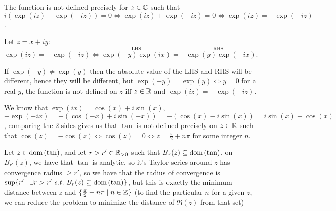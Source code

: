 \begin{cExercise}
	\begin{cPart}
		The function is not defined precisely for $z\in\mathbb C$ such that $i(\exp(iz)+\exp(-iz))= 0\iff \exp(iz)+\exp(-iz)= 0\iff \exp(iz)= -\exp(-iz)$.
		
		Let $z=x+i y$: $\exp(iz)= -\exp(-iz)\iff \overset{\text{LHS}}{\exp(-y)\exp(ix)}=\overset{\text{RHS}}{-\exp(y)\exp(-ix)}$.
		
		If $\exp(-y)\ne \exp(y)$ then the absolute value of the LHS and RHS will be different, hence they will be different, but $\exp(-y)=\exp(y)\iff y=0$ for a real $y$, the function is not defined on $z$ iff $z\in \mathbb R$ and $\exp(iz)=-\exp(-iz)$.
		
		We know that $\exp(ix)=\cos(x)+i\sin(x)$, $-\exp(-ix)=-(\cos(-x)+i\sin(-x))=-(\cos(x)-i\sin(x))=i\sin(x)-\cos(x)$, comparing the $2$ sides gives us that $\tan$ is not defined precisely on $z\in\mathbb R$ such that $\cos(z)=-\cos(z)\iff \cos(z)=0\iff z=\frac\pi2+n\pi$ for some integer $n$.
	\end{cPart}
	\begin{cPart}
		Let $z\in\operatorname{dom}\left(\tan\right)$, and let $r>r'\in\mathbb R_{>0}$ such that $B_r(z)\subseteq \operatorname{dom}\left(\tan\right)$, on $B_{r'}(z)$, we have that $\tan$ is analytic, so it's Taylor series around $z$ has convergence radius $\ge r'$, so we have that the radius of convergence is $\sup\{r'\mid \exists r>r'\ s.t.\ B_r(z)\subseteq \operatorname{dom}\left(\tan\right)\}$, but this is exactly the minimum distance between $z$ and $\{\frac\pi2+n\pi\mid n\in\mathbb Z\}$ (to find the particular $n$ for a given $z$, we can reduce the problem to minimize the distance of $\Re(z)$ from that set)
	\end{cPart}
\end{cExercise}
